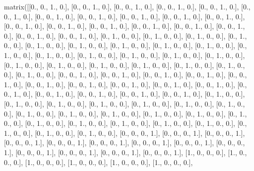 \documentclass[letterpaper,10pt,english]{jupyterBook}
\begin{document}
\begin{sphinxVerbatim}[commandchars=\\\{\}]
matrix([[0., 0., 1., 0.],
        [0., 0., 1., 0.],
        [0., 0., 1., 0.],
        [0., 0., 1., 0.],
        [0., 0., 1., 0.],
        [0., 0., 1., 0.],
        [0., 0., 1., 0.],
        [0., 0., 1., 0.],
        [0., 0., 1., 0.],
        [0., 0., 1., 0.],
        [0., 0., 1., 0.],
        [0., 0., 1., 0.],
        [0., 0., 1., 0.],
        [0., 0., 1., 0.],
        [0., 0., 1., 0.],
        [0., 0., 1., 0.],
        [0., 0., 1., 0.],
        [0., 0., 1., 0.],
        [0., 0., 1., 0.],
        [0., 1., 0., 0.],
        [0., 1., 0., 0.],
        [0., 1., 0., 0.],
        [0., 1., 0., 0.],
        [0., 1., 0., 0.],
        [0., 1., 0., 0.],
        [0., 1., 0., 0.],
        [0., 1., 0., 0.],
        [0., 1., 0., 0.],
        [0., 1., 0., 0.],
        [0., 1., 0., 0.],
        [0., 1., 0., 0.],
        [0., 1., 0., 0.],
        [0., 1., 0., 0.],
        [0., 1., 0., 0.],
        [0., 1., 0., 0.],
        [0., 1., 0., 0.],
        [0., 1., 0., 0.],
        [0., 1., 0., 0.],
        [0., 1., 0., 0.],
        [0., 1., 0., 0.],
        [0., 1., 0., 0.],
        [0., 0., 1., 0.],
        [0., 0., 1., 0.],
        [0., 0., 1., 0.],
        [0., 0., 1., 0.],
        [0., 0., 1., 0.],
        [0., 0., 1., 0.],
        [0., 0., 1., 0.],
        [0., 0., 1., 0.],
        [0., 0., 1., 0.],
        [0., 0., 1., 0.],
        [0., 0., 1., 0.],
        [0., 0., 1., 0.],
        [0., 0., 1., 0.],
        [0., 0., 1., 0.],
        [0., 0., 1., 0.],
        [0., 1., 0., 0.],
        [0., 1., 0., 0.],
        [0., 1., 0., 0.],
        [0., 1., 0., 0.],
        [0., 1., 0., 0.],
        [0., 1., 0., 0.],
        [0., 1., 0., 0.],
        [0., 1., 0., 0.],
        [0., 1., 0., 0.],
        [0., 1., 0., 0.],
        [0., 1., 0., 0.],
        [0., 1., 0., 0.],
        [0., 1., 0., 0.],
        [0., 1., 0., 0.],
        [0., 1., 0., 0.],
        [0., 1., 0., 0.],
        [0., 1., 0., 0.],
        [0., 1., 0., 0.],
        [0., 1., 0., 0.],
        [0., 1., 0., 0.],
        [0., 1., 0., 0.],
        [0., 0., 0., 1.],
        [0., 0., 0., 1.],
        [0., 0., 0., 1.],
        [0., 0., 0., 1.],
        [0., 0., 0., 1.],
        [0., 0., 0., 1.],
        [0., 0., 0., 1.],
        [0., 0., 0., 1.],
        [0., 0., 0., 1.],
        [0., 0., 0., 1.],
        [0., 0., 0., 1.],
        [0., 0., 0., 1.],
        [0., 0., 0., 1.],
        [1., 0., 0., 0.],
        [1., 0., 0., 0.],
        [1., 0., 0., 0.],
        [1., 0., 0., 0.],
        [1., 0., 0., 0.],
        [1., 0., 0., 0.],

\end{sphinxVerbatim}
\end{document}

